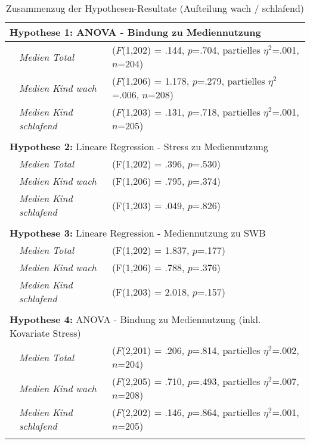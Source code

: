 \begin{table}[ht]
\begin{tabular}{l l  l }

  \multicolumn{3}{l}{\textbf{Hypothese 1:} ANOVA - Bindung zu Mediennutzung}\\
  \hline
  & \textit{Medien Total} & ($F$(1,202) = .144, $p$=.704, partielles $\eta^2$=.001, $n$=204)\\
  & \textit{Medien Kind wach} & ($F$(1,206) = 1.178, $p$=.279, partielles $\eta^2$=.006, $n$=208)\\
  & \textit{Medien Kind schlafend} & ($F$(1,203) = .131, $p$=.718, partielles $\eta^2$=.001, $n$=205)\\
  &&\\
  
  \multicolumn{3}{l}{\textbf{Hypothese 2:} Lineare Regression - Stress zu Mediennutzung}\\
  \hline
  & \textit{Medien Total} & (F(1,202) = .396, $p$=.530)\\
  & \textit{Medien Kind wach} & (F(1,206) = .795, $p$=.374)\\
  & \textit{Medien Kind schlafend} & (F(1,203) = .049, $p$=.826)\\
    &&\\
  
  \multicolumn{3}{l}{\textbf{Hypothese 3:} Lineare Regression - Mediennutzung zu SWB}\\
  \hline
  &\textit{Medien Total} & (F(1,202) = 1.837, $p$=.177)\\
  & \textit{Medien Kind wach} & (F(1,206) = .788, $p$=.376)\\
  & \textit{Medien Kind schlafend} & (F(1,203) = 2.018, $p$=.157)\\
  &&\\

  \multicolumn{3}{l}{\textbf{Hypothese 4:} ANOVA - Bindung zu Mediennutzung (inkl. Kovariate Stress)}\\
  \hline
  & \textit{Medien Total} & ($F$(2,201) = .206, $p$=.814, partielles $\eta^2$=.002, $n$=204)\\
  & \textit{Medien Kind wach} & ($F$(2,205) = .710, $p$=.493, partielles $\eta^2$=.007, $n$=208)\\
  & \textit{Medien Kind schlafend} & ($F$(2,202) = .146, $p$=.864, partielles $\eta^2$=.001, $n$=205)\\
  &&\\
\end{tabular}
\caption{Zusammenzug der Hypothesen-Resultate (Aufteilung wach / schlafend)}
\label{table:AppZusammenzugResultate}
\end{table}